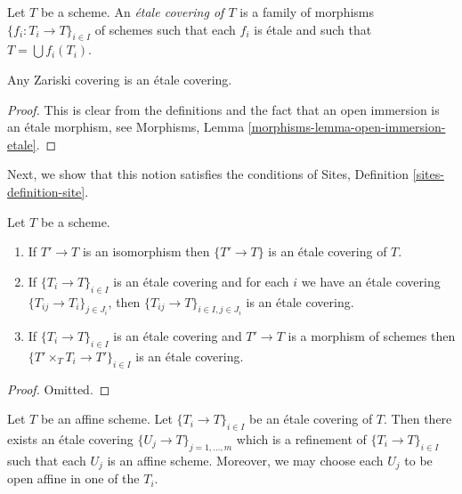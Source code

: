 \begin{definition}
\label{definition-etale-covering}
Let $T$ be a scheme. An {\it \'etale covering of $T$} is a family
of morphisms $\{f_i : T_i \to T\}_{i \in I}$ of schemes
such that each $f_i$ is \'etale and such that $T = \bigcup f_i(T_i)$.
\end{definition}

\begin{lemma}
\label{lemma-zariski-etale}
Any Zariski covering is an \'etale covering.
\end{lemma}

\begin{proof}
This is clear from the definitions and the fact that an open immersion
is an \'etale morphism, see
Morphisms, Lemma \ref{morphisms-lemma-open-immersion-etale}.
\end{proof}

\noindent
Next, we show that this notion satisfies the conditions of
Sites, Definition \ref{sites-definition-site}.

\begin{lemma}
\label{lemma-etale}
Let $T$ be a scheme.
\begin{enumerate}
\item If $T' \to T$ is an isomorphism then $\{T' \to T\}$
is an \'etale covering of $T$.
\item If $\{T_i \to T\}_{i\in I}$ is an \'etale covering and for each
$i$ we have an \'etale covering $\{T_{ij} \to T_i\}_{j\in J_i}$, then
$\{T_{ij} \to T\}_{i \in I, j\in J_i}$ is an \'etale covering.
\item If $\{T_i \to T\}_{i\in I}$ is an \'etale covering
and $T' \to T$ is a morphism of schemes then
$\{T' \times_T T_i \to T'\}_{i\in I}$ is an \'etale covering.
\end{enumerate}
\end{lemma}

\begin{proof}
Omitted.
\end{proof}

\begin{lemma}
\label{lemma-etale-affine}
Let $T$ be an affine scheme.
Let $\{T_i \to T\}_{i \in I}$ be an \'etale covering of $T$.
Then there exists an \'etale covering
$\{U_j \to T\}_{j = 1, \ldots, m}$ which is a refinement
of $\{T_i \to T\}_{i \in I}$ such that each $U_j$ is an affine
scheme. Moreover, we may choose each $U_j$ to be open affine
in one of the $T_i$.
\end{lemma}

